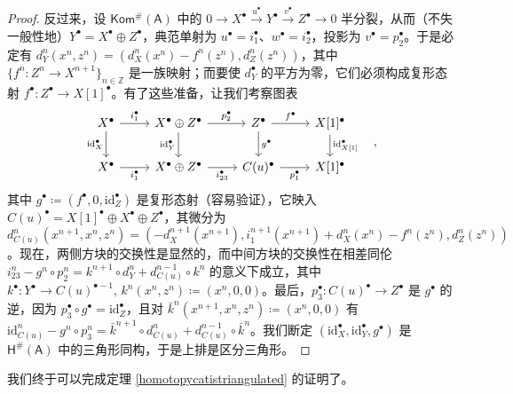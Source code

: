 \begin{proof}
	反过来，设 $\mathsf{Kom^\#\!(A)}$ 中的 $0\rightarrow X^\bullet\xrightarrow{u^\bullet} Y^\bullet\xrightarrow{v^\bullet} Z^\bullet\rightarrow 0$ 半分裂，从而（不失一般性地）$Y^\bullet=X^\bullet\oplus Z^\bullet$，典范单射为 $u^\bullet=i_1^\bullet$、$w^\bullet=i_2^\bullet$，投影为 $v^\bullet=p_2^\bullet$。于是必定有 $d_Y^n(x^n,z^n)=(d_X^n(x^n)-f^n(z^n),d_Z^n(z^n))$，其中 $\{f^n:Z^n\rightarrow X^{n+1}\}_{n\in\mathbb{Z}}$ 是一族映射；而要使 $d_Y^\bullet$ 的平方为零，它们必须构成复形态射 $f^\bullet:Z^\bullet\rightarrow X[1]^\bullet$。有了这些准备，让我们考察图表
	\[
	\begin{tikzcd}
		X^\bullet\arrow[r, "i_1^\bullet"]\arrow[d, "\text{id}_X^\bullet"'] & X^\bullet\oplus Z^\bullet\arrow[r, "p_2^\bullet"]\arrow[d, "\text{id}_Y^\bullet"'] & Z^\bullet\arrow[r, "f^\bullet"]\arrow[d, "g^\bullet"] & X[1]^\bullet\arrow[d, "\text{id}_{X[1]}^\bullet"] \\
		X^\bullet\arrow[r, "i_1^\bullet"'] & X^\bullet\oplus Z^\bullet\arrow[r, "i_{23}^\bullet"'] & C(u)^\bullet\arrow[r, "p_1^\bullet"'] & X[1]^\bullet
	\end{tikzcd}\quad,
	\]
	其中 $g^\bullet\coloneqq(f^\bullet,0,\text{id}_Z^\bullet)$ 是复形态射（容易验证），它映入 $C(u)^\bullet=X[1]^\bullet\oplus X^\bullet\oplus Z^\bullet$，其微分为 $d_{C(u)}^n(x^{n+1},x^n,z^n)=(-d_X^{n+1}(x^{n+1}),i_1^{n+1}(x^{n+1})+d_X^n(x^n)-f^n(z^n),d_Z^n(z^n))$。现在，两侧方块的交换性是显然的，而中间方块的交换性在相差同伦 $i_{23}^n-g^n\circ p_2^n=k^{n+1}\circ d_Y^n+d_{C(u)}^{n-1}\circ k^n$ 的意义下成立，其中 $k^\bullet:Y^\bullet\rightarrow C(u)^{\bullet-1},\, k^n(x^n,z^n)\coloneqq(x^n,0,0)$。最后，$p_3^\bullet:C(u)^\bullet\rightarrow Z^\bullet$ 是 $g^\bullet$ 的逆，因为 $p_3^\bullet\circ g^\bullet=\text{id}_Z^\bullet$，且对 $\bar{k}^n(x^{n+1},x^n,z^n)\coloneqq(x^n,0,0)$ 有 $\text{id}_{C(u)}^n-g^n\circ p_3^n=\bar{k}^{n+1}\circ d_{C(u)}^n + d_{C(u)}^{n-1}\circ \bar{k}^n$。我们断定 $(\text{id}_X^\bullet,\text{id}_Y^\bullet,g^\bullet)$ 是 $\mathsf{H^\#\!(A)}$ 中的三角形同构，于是上排是区分三角形。
\end{proof}

我们终于可以完成定理 \ref{homotopycatistriangulated} 的证明了。


